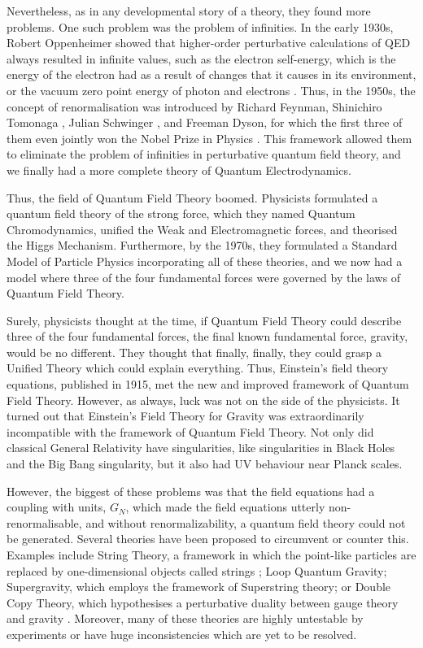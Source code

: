 \documentclass[12pt,a4paper]{report}
\theoremstyle{plain}
\theoremstyle{definition}
\theoremstyle{remark}
\begin{document}
Nevertheless, as in any developmental story of a theory, they found more problems. One such problem was the problem of infinities. In the early 1930s, Robert Oppenheimer showed that higher-order perturbative calculations of QED always resulted in infinite values, such as the electron self-energy, which is the energy of the electron had as a result of changes that it causes in its environment, or the vacuum zero point energy of photon and electrons \cite{Oppie}. Thus, in the 1950s, the concept of renormalisation was introduced by Richard Feynman, Shinichiro Tomonaga \cite{Tomonaga1948OnIF, Fukuda1948ASS}, Julian Schwinger \cite{PhysRev.74.1439}, and Freeman Dyson, for which the first three of them even jointly won the Nobel Prize in Physics \cite{Schweber1994QEDAT}. This framework allowed them to eliminate the problem of infinities in perturbative quantum field theory, and we finally had a more complete theory of Quantum Electrodynamics. 

Thus, the field of Quantum Field Theory boomed. Physicists formulated a quantum field theory of the strong force, which they named Quantum Chromodynamics, unified the Weak and Electromagnetic forces, and theorised the Higgs Mechanism. Furthermore, by the 1970s, they formulated a Standard Model of Particle Physics incorporating all of these theories, and we now had a model where three of the four fundamental forces were governed by the laws of Quantum Field Theory.

Surely, physicists thought at the time, if Quantum Field Theory could describe three of the four fundamental forces, the final known fundamental force, gravity, would be no different. They thought that finally, finally, they could grasp a Unified Theory which could explain everything. Thus, Einstein's field theory equations, published in 1915, met the new and improved framework of Quantum Field Theory. However, as always, luck was not on the side of the physicists. It turned out that Einstein's Field Theory for Gravity was extraordinarily incompatible with the framework of Quantum Field Theory. Not only did classical General Relativity have singularities, like singularities in Black Holes and the Big Bang singularity, but it also had UV behaviour near Planck scales. 

However, the biggest of these problems was that the field equations had a coupling with units, $G_N$, which made the field equations utterly non-renormalisable, and without renormalizability, a quantum field theory could not be generated. Several theories have been proposed to circumvent or counter this. Examples include String Theory, a framework in which the point-like particles are replaced by one-dimensional objects called strings \cite{Tong_2009}; Loop Quantum Gravity; Supergravity, which employs the framework of Superstring theory; or Double Copy Theory, which hypothesises a perturbative duality between gauge theory and gravity \cite{DoubleCopy}. Moreover, many of these theories are highly untestable by experiments or have huge inconsistencies which are yet to be resolved.
\end{document}
